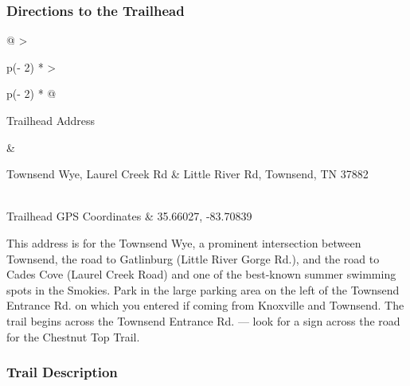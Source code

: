 \documentclass[
  letterpaper,
  DIV=11,
  numbers=noendperiod]{scrartcl}
\begin{document}
\hypertarget{directions-to-the-trailhead-26}{%
\subsubsection{Directions to the
Trailhead}\label{directions-to-the-trailhead-26}}

\begin{longtable}[]{@{}
  >{\raggedright\arraybackslash}p{(\columnwidth - 2\tabcolsep) * }
  >{\raggedright\arraybackslash}p{(\columnwidth - 2\tabcolsep) * }@{}}
\toprule\noalign{}
\begin{minipage}[b]{\linewidth}\raggedright
Trailhead Address
\end{minipage} & \begin{minipage}[b]{\linewidth}\raggedright
Townsend Wye, Laurel Creek Rd \& Little River Rd, Townsend, TN 37882
\end{minipage} \\
\midrule\noalign{}
\endhead
\bottomrule\noalign{}
\endlastfoot
Trailhead GPS Coordinates & 35.66027, -83.70839 \\
\end{longtable}

This address is for the Townsend Wye, a prominent intersection between
Townsend, the road to Gatlinburg (Little River Gorge Rd.), and the road
to Cades Cove (Laurel Creek Road) and one of the best-known summer
swimming spots in the Smokies. Park in the large parking area on the
left of the Townsend Entrance Rd. on which you entered if coming from
Knoxville and Townsend. The trail begins across the Townsend Entrance
Rd. --- look for a sign across the road for the Chestnut Top Trail.

\hypertarget{trail-description-26}{%
\subsubsection{Trail Description}\label{trail-description-26}}
\end{document}
